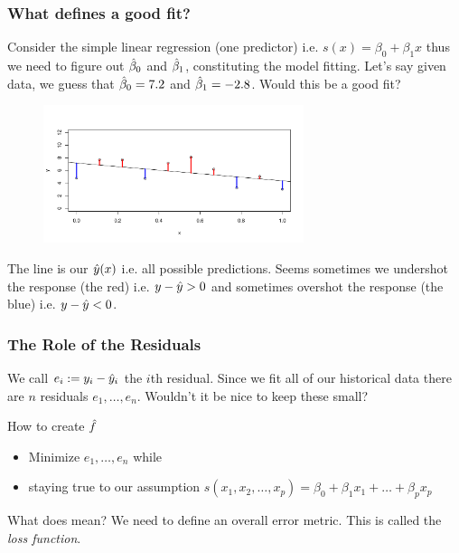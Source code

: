 \documentclass[handout]{beamer}
\begin{document}
\begin{frame}\frametitle{What defines a good fit?}

\small

Consider the simple linear regression (one predictor) i.e. $s(x) = \beta_0 + \beta_1 x$ thus we need to figure out $\hat{\beta}_0$ and  $\hat{\beta}_1$, constituting the model fitting. Let's say given data, we guess that $\hat{\beta}_0 = 7.2$ and $\hat{\beta}_1 = -2.8$. Would this be a good fit?

\vspace{-0.5cm}
\begin{figure}
\centering\includegraphics[width=3.0in]{residuals}
\end{figure}

The line is our $\hat{y}(x)$ i.e. all possible predictions. Seems sometimes we undershot the response (the red) i.e. $y - \hat{y} > 0$ and sometimes overshot the response (the blue) i.e. $y - \hat{y} < 0$.

	
\end{frame}

\begin{frame}\frametitle{The Role of the Residuals}

We call $e_i := y_i - \hat{y}_i$ the $i$th residual. Since we fit all of our historical data there are $n$ residuals $e_1, \ldots, e_n$. Wouldn't it be nice to keep these small? \pause 

\begin{block}{How to create $\hat{f}$}
\begin{itemize}
\item Minimize $e_1, \ldots, e_n$ while
\item staying true to our assumption $s(x_1, x_2, \ldots, x_p) = \beta_0 + \beta_1 x_1 + \ldots + \beta_p x_p$
\end{itemize}
\end{block}

What does  mean? \pause  We need to define an overall error metric. This is called the \emph{loss function}.
	
\end{frame}
\end{document}
